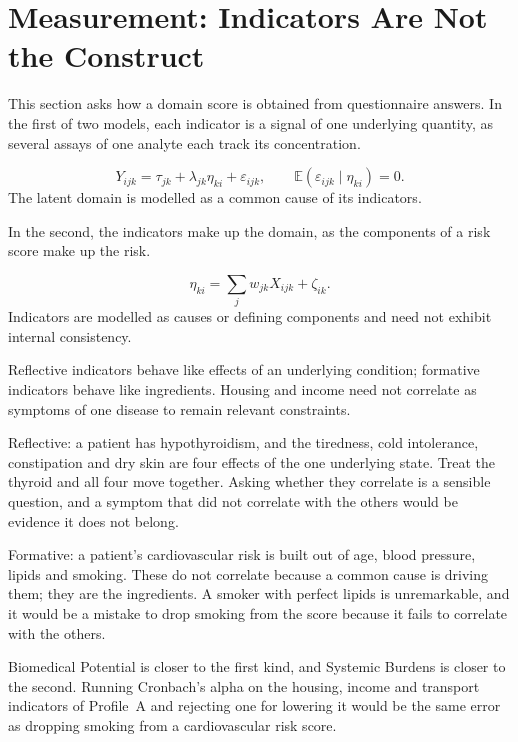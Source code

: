 \section{Measurement: Indicators Are Not the Construct}
\label{app:a-measurement}

This section asks how a domain score is obtained from questionnaire answers.
In the first of two models, each
indicator is a signal of one underlying quantity, as several assays of one
analyte each track its concentration.

\begin{definition}
\[
Y_{ijk}=\tau_{jk}+\lambda_{jk}\eta_{ki}+\varepsilon_{ijk},\qquad
\mathbb E(\varepsilon_{ijk}\mid\eta_{ki})=0.
\]
The latent domain is modelled as a common cause of its indicators.
\end{definition}

In the second, the indicators make up the domain, as the components of a risk
score make up the risk.

\begin{definition}
\[
\eta_{ki}=\sum_jw_{jk}X_{ijk}+\zeta_{ik}.
\]
Indicators are modelled as causes or defining components and need not exhibit
internal consistency.
\end{definition}

\begin{remark}
Reflective indicators behave like effects of an underlying condition;
formative indicators behave like ingredients. Housing and income need not
correlate as symptoms of one disease to remain relevant constraints.
\citep{bollen_lennox_1991,jarvis_2003}
\end{remark}

\begin{reading}
Reflective: a patient has hypothyroidism, and the tiredness, cold intolerance,
constipation and dry skin are four effects of the one underlying state. Treat
the thyroid and all four move together. Asking whether they correlate is a
sensible question, and a symptom that did not correlate with the others would
be evidence it does not belong.

Formative: a patient's cardiovascular risk is built out of age, blood pressure,
lipids and smoking. These do not correlate because a common cause is driving
them; they are the ingredients. A smoker with perfect lipids is unremarkable,
and it would be a mistake to drop smoking from the score because it fails to
correlate with the others.

Biomedical Potential is closer to the first kind, and Systemic Burdens is
closer to the second. Running Cronbach's alpha on the housing, income and
transport indicators of Profile~A and rejecting one for lowering it would be the same error
as dropping smoking from a cardiovascular risk score.
\end{reading}

